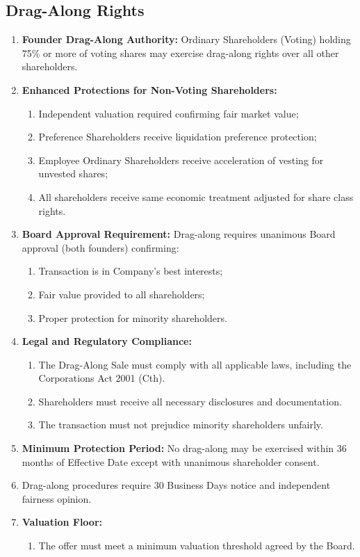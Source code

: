 \subsection{Drag-Along Rights} \label{subsec:DragAlong}
\begin{enumerate}[label=(\alph*)]
\item \textbf{Founder Drag-Along Authority:} Ordinary Shareholders (Voting) holding 75\% or more of voting shares may exercise drag-along rights over all other shareholders.
\item \textbf{Enhanced Protections for Non-Voting Shareholders:}
    \begin{enumerate}[label=(\roman*)]
    \item Independent valuation required confirming fair market value;
    \item Preference Shareholders receive liquidation preference protection;
    \item Employee Ordinary Shareholders receive acceleration of vesting for unvested shares;
    \item All shareholders receive same economic treatment adjusted for share class rights.
    \end{enumerate}
\item \textbf{Board Approval Requirement:} Drag-along requires unanimous Board approval (both founders) confirming:
    \begin{enumerate}[label=(\roman*)]
    \item Transaction is in Company's best interests;
    \item Fair value provided to all shareholders;
    \item Proper protection for minority shareholders.
    \end{enumerate}
\item \textbf{Legal and Regulatory Compliance:}
    \begin{enumerate}[label=(\roman*)]
    \item The Drag-Along Sale must comply with all applicable laws, including the Corporations Act 2001 (Cth).
    \item Shareholders must receive all necessary disclosures and documentation.
    \item The transaction must not prejudice minority shareholders unfairly.
    \end{enumerate}
\item \textbf{Minimum Protection Period:} No drag-along may be exercised within 36 months of Effective Date except with unanimous shareholder consent.
\item Drag-along procedures require 30 Business Days notice and independent fairness opinion.
\item \textbf{Valuation Floor:}
    \begin{enumerate}[label=(\roman*)]
    \item The offer must meet a minimum valuation threshold agreed by the Board.
    \end{enumerate}
\end{enumerate}

